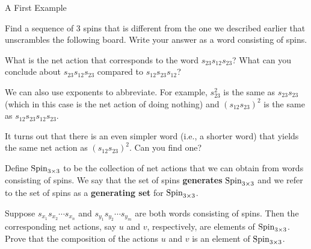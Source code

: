 \begin{section}{A First Example}
\begin{problem}\label{prob:3_different_spins}
Find a sequence of 3 spins that is different from the one we described earlier that unscrambles the following board. Write your answer as a word consisting of spins.
\begin{center}
\end{center}
\end{problem}

\begin{problem}
What is the net action that corresponds to the word $s_{23} s_{12} s_{23}$? What can you conclude about $s_{23} s_{12} s_{23}$ compared to 
$s_{12} s_{23} s_{12}$?
\end{problem}

We can also use exponents to abbreviate.  For example, $s_{23}^2$ is the same as $s_{23} s_{23}$ (which in this case is the net action of doing nothing) and $(s_{12} s_{23})^2$ is the same as $s_{12} s_{23} s_{12} s_{23}$.

\begin{problem}\label{prob:braid_relation}
It turns out that there is an even simpler word (i.e., a shorter word) that yields the same net action as $(s_{12} s_{23})^2$. Can you find one?
\end{problem}

Define $\operatorname{Spin}_{3\times 3}$ to be the collection of net actions that we can obtain from words consisting of spins.  We say that the set of spins \textbf{generates} $\operatorname{Spin}_{3\times 3}$ and we refer to the set of spins as a \textbf{generating set} for $\operatorname{Spin}_{3\times 3}$.  

\begin{problem}
Suppose $s_{x_1}s_{x_2}\cdots s_{x_n}$ and $s_{y_1}s_{y_2}\cdots s_{y_m}$ are both words consisting of spins. Then the corresponding net actions, say $u$ and $v$, respectively, are elements of $\operatorname{Spin}_{3\times 3}$. Prove that the composition of the actions $u$ and $v$ is an element of $\operatorname{Spin}_{3\times 3}$.
\end{problem}


\end{section}
